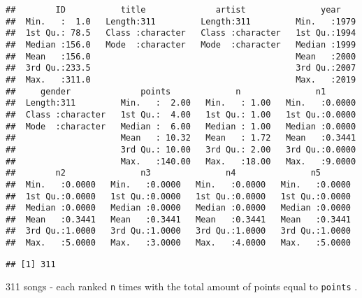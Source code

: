 \documentclass[
]{article}
\newenvironment{Shaded}{\begin{snugshade}}{\end{snugshade}}
\newcommand{\DataTypeTok}[1]{\textcolor[rgb]{0.13,0.29,0.53}{#1}}
\newcommand{\DecValTok}[1]{\textcolor[rgb]{0.00,0.00,0.81}{#1}}
\newcommand{\KeywordTok}[1]{\textcolor[rgb]{0.13,0.29,0.53}{\textbf{#1}}}
\newcommand{\NormalTok}[1]{#1}
\newcommand{\OperatorTok}[1]{\textcolor[rgb]{0.81,0.36,0.00}{\textbf{#1}}}
\newcommand{\StringTok}[1]{\textcolor[rgb]{0.31,0.60,0.02}{#1}}
\begin{document}
\begin{verbatim}
##        ID           title              artist               year     
##  Min.   :  1.0   Length:311         Length:311         Min.   :1979  
##  1st Qu.: 78.5   Class :character   Class :character   1st Qu.:1994  
##  Median :156.0   Mode  :character   Mode  :character   Median :1999  
##  Mean   :156.0                                         Mean   :2000  
##  3rd Qu.:233.5                                         3rd Qu.:2007  
##  Max.   :311.0                                         Max.   :2019  
##     gender              points             n               n1        
##  Length:311         Min.   :  2.00   Min.   : 1.00   Min.   :0.0000  
##  Class :character   1st Qu.:  4.00   1st Qu.: 1.00   1st Qu.:0.0000  
##  Mode  :character   Median :  6.00   Median : 1.00   Median :0.0000  
##                     Mean   : 10.32   Mean   : 1.72   Mean   :0.3441  
##                     3rd Qu.: 10.00   3rd Qu.: 2.00   3rd Qu.:0.0000  
##                     Max.   :140.00   Max.   :18.00   Max.   :9.0000  
##        n2               n3               n4               n5        
##  Min.   :0.0000   Min.   :0.0000   Min.   :0.0000   Min.   :0.0000  
##  1st Qu.:0.0000   1st Qu.:0.0000   1st Qu.:0.0000   1st Qu.:0.0000  
##  Median :0.0000   Median :0.0000   Median :0.0000   Median :0.0000  
##  Mean   :0.3441   Mean   :0.3441   Mean   :0.3441   Mean   :0.3441  
##  3rd Qu.:1.0000   3rd Qu.:1.0000   3rd Qu.:1.0000   3rd Qu.:1.0000  
##  Max.   :5.0000   Max.   :3.0000   Max.   :4.0000   Max.   :5.0000
\end{verbatim}

\begin{Shaded}
\end{Shaded}

\begin{verbatim}
## [1] 311
\end{verbatim}

311 songs - each ranked \texttt{n} times with the total amount of points
equal to \texttt{points} .

\begin{Shaded}
\end{Shaded}
\end{document}
